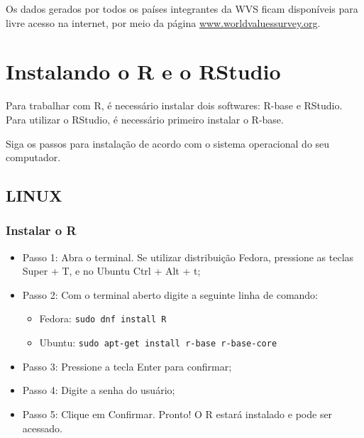 \documentclass[
  10pt,
  brazil,
  a4paper,
  twoside, notitlepage, openright]{book}
\providecommand{\tightlist}{%
  \setlength{\itemsep}{0pt}\setlength{\parskip}{0pt}}
\begin{document}
Os dados gerados por todos os países integrantes da WVS ficam disponíveis para livre acesso na internet, por meio da página \url{www.worldvaluessurvey.org}.

\hypertarget{instalando-o-r-e-o-rstudio}{%
\chapter{Instalando o R e o RStudio}\label{instalando-o-r-e-o-rstudio}}

Para trabalhar com R, é necessário instalar dois softwares: R-base e RStudio. Para utilizar o RStudio, é necessário primeiro instalar o R-base.

Siga os passos para instalação de acordo com o sistema operacional do seu computador.

\hypertarget{linux}{%
\section{LINUX}\label{linux}}

\hypertarget{instalar-o-r}{%
\subsection{Instalar o R}\label{instalar-o-r}}

\begin{itemize}
\tightlist
\item
  Passo 1: Abra o terminal. Se utilizar distribuição Fedora, pressione as teclas Super + T, e no Ubuntu Ctrl + Alt + t;\\
\item
  Passo 2: Com o terminal aberto digite a seguinte linha de comando:

  \begin{itemize}
  \tightlist
  \item
    Fedora: \texttt{sudo\ dnf\ install\ R}
  \item
    Ubuntu: \texttt{sudo\ apt-get\ install\ r-base\ r-base-core}\\
  \end{itemize}
\item
  Passo 3: Pressione a tecla Enter para confirmar;\\
\item
  Passo 4: Digite a senha do usuário;\\
\item
  Passo 5: Clique em Confirmar. Pronto! O R estará instalado e pode ser acessado.
\end{itemize}
\end{document}
